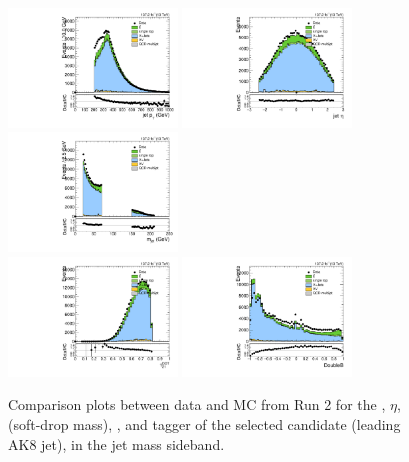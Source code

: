 \begin{figure}[htbp]
  \centering
  \includegraphics[width=0.4\textwidth]{fig/analysis/SB_b1_allL_allP_allC_allE_Run2_lnujj_l2_pt.pdf}
  \includegraphics[width=0.4\textwidth]{fig/analysis/SB_b1_allL_allP_allC_allE_Run2_lnujj_l2_eta.pdf}\\
  \includegraphics[width=0.4\textwidth]{fig/analysis/SB_b1_allL_allP_allC_allE_Run2_mjet.pdf}\\
  \includegraphics[width=0.4\textwidth]{fig/analysis/SB_b1_allL_allP_allC_allE_Run2_tau21DDT.pdf}
  \includegraphics[width=0.4\textwidth]{fig/analysis/SB_b1_allL_allP_allC_allE_Run2_DoubleB.pdf}\\
  \caption{
    Comparison plots between data and MC from Run 2 for the \pt, $\eta$, \MJ (soft-drop mass), \nsubjDDT, and \DoubleB tagger of the selected \Vhad candidate (leading AK8 jet), in the jet mass sideband.
  }
  \label{fig:SB_controlPlotsRun2_3}
\end{figure}

